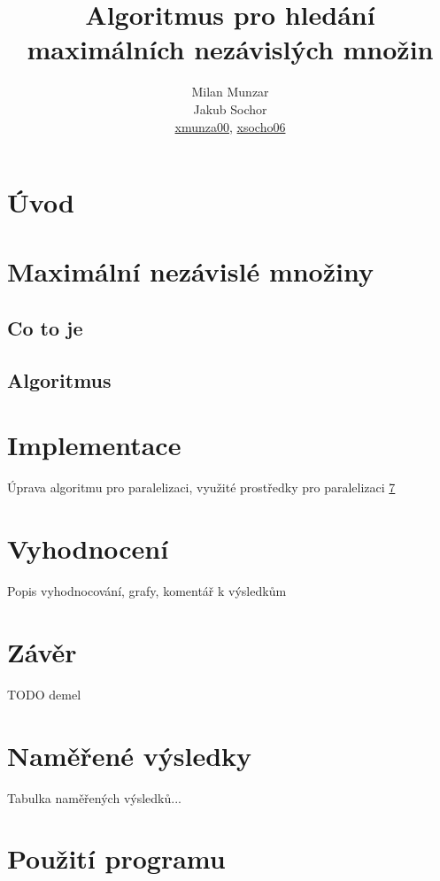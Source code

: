 \documentclass[12pt]{article}
\title{Algoritmus pro hledání maximálních nezávislých množin}
\author{Milan Munzar\\
Jakub Sochor\\
\normalsize{\url{xmunza00}, \url{xsocho06} }}
\date{}
\begin{document}
\maketitle

\section{Úvod}

\section{Maximální nezávislé množiny}
\subsection{Co to je}
\subsection{Algoritmus}


\section{Implementace}
Úprava algoritmu pro paralelizaci, využité prostředky pro paralelizaci \ref{sec:ProgramUsage}


\section{Vyhodnocení}
Popis vyhodnocování, grafy, komentář k výsledkům

\section{Závěr}

\begin{thebibliography}{99}
 TODO demel
\end{thebibliography}

\appendix
\section{Naměřené výsledky}
Tabulka naměřených výsledků...

\section{Použití programu} \label{sec:ProgramUsage}
\end{document}
